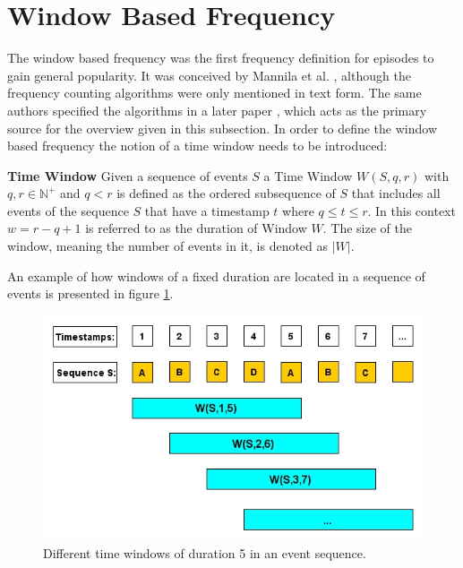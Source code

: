 \section{Window Based Frequency}
\label{sec_windowBased}
The window based frequency was the first frequency definition for episodes to gain general popularity. It was conceived by Mannila et al. \cite{mannila1995discovering}, although the frequency counting algorithms were only mentioned in text form. The same authors  specified the algorithms in a later paper \cite{mannila1997discovery}, which acts as the primary source for the overview given in this subsection. In order to define the window based frequency the notion of a time window needs to be introduced: 

\begin{mydef}
\label{def_timeWindow}
\textbf{Time Window} Given a sequence of events $S$ a Time Window $W(S,q,r)$ with $q,r \in \mathbb{N}^+$ and $q < r$ is defined as the ordered subsequence of $S$ that includes all events of the sequence $S$ that have a timestamp $t$ where $q \leq t\leq r$. In this context $w = r-q+1$ is referred to as the duration of Window $W$. The size of the window, meaning the number of events in it, is denoted as $|W|$.
\end{mydef}

An example of how windows of a fixed duration are located in a sequence of events is presented in figure \ref{fig_windowBasedFrequency}.

\begin{figure}[h]
	\centering
  	\includegraphics[width=\textwidth]{windowBasedFrequency}
	\caption[Time Windows in an Event Sequence]{Different time windows of duration 5 in an event sequence.}
	\label{fig_windowBasedFrequency}
\end{figure}


